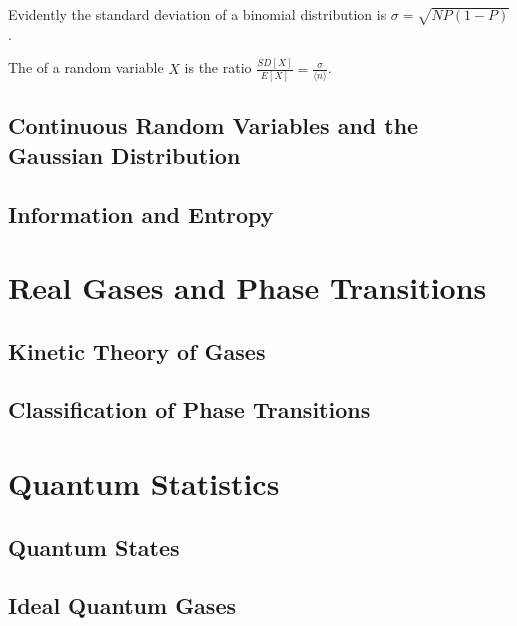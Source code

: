 \documentclass[12pt, a4paper, oneside, openright, titlepage]{book}
\begin{document}
Evidently the standard deviation of a binomial distribution is $\sigma = \sqrt{NP(1-P)}$.

\begin{defn}
    The  of a random variable $X$ is the ratio $\frac{SD[X]}{E[X]} = \frac{\sigma}{\langle n \rangle}$.
\end{defn}





\chapter{Continuous Random Variables and the Gaussian Distribution}





\chapter{Information and Entropy}





\part{Real Gases and Phase Transitions}


\chapter{Kinetic Theory of Gases}



\chapter{Classification of Phase Transitions}






\part{Quantum Statistics}


\chapter{Quantum States}


\chapter{Ideal Quantum Gases}








\begin{appendices}


\end{appendices}
\end{document}
